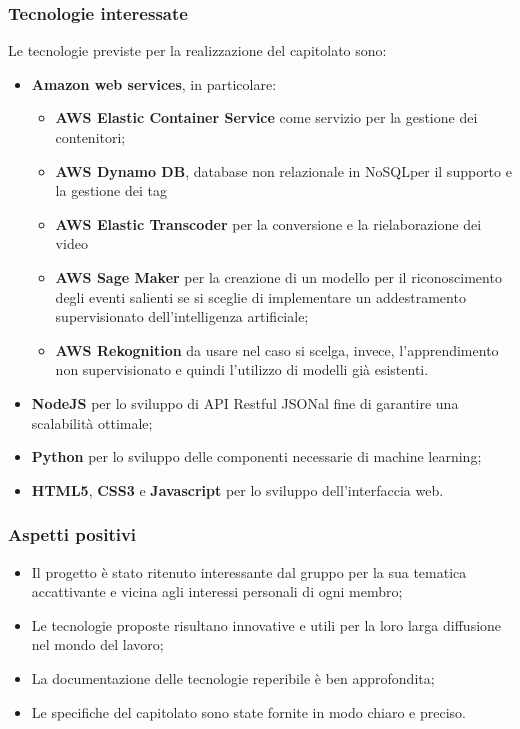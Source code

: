 \subsubsection{Tecnologie interessate}
Le tecnologie previste per la realizzazione del capitolato sono:
\begin{itemize}
	\item \textbf{Amazon web services\glo}, in particolare:
	\begin{itemize}
		\item \textbf{AWS Elastic Container Service\glo} come servizio per la gestione dei contenitori;
		\item \textbf{AWS Dynamo DB\glo}, database non relazionale in NoSQL\glo per il supporto e la gestione dei tag
		\item \textbf{AWS Elastic Transcoder\glo} per la conversione e la rielaborazione dei video
		\item \textbf{AWS Sage Maker\glo} per la creazione di un modello per il riconoscimento degli eventi salienti se si sceglie di implementare un addestramento supervisionato dell'intelligenza artificiale;
		\item \textbf{AWS Rekognition\glo} da usare nel caso si scelga, invece, l'apprendimento non supervisionato e quindi l'utilizzo di modelli già esistenti.
	\end{itemize}
	\item \textbf{NodeJS\glo} per lo sviluppo di API Restful JSON\glo al fine di garantire una scalabilità ottimale;
	\item \textbf{Python\glo} per lo sviluppo delle componenti necessarie di machine learning;
	\item \textbf{HTML5\glo}, \textbf{CSS3\glo} e \textbf{Javascript\glo} per lo sviluppo dell'interfaccia web. 
\end{itemize}
\subsubsection{Aspetti positivi}
\begin{itemize}
	\item Il progetto è stato ritenuto interessante dal gruppo per la sua tematica accattivante e vicina agli interessi personali di ogni membro;
	\item Le tecnologie proposte risultano innovative e utili per la loro larga diffusione nel mondo del lavoro;
	\item La documentazione delle tecnologie reperibile è ben approfondita;
	\item Le specifiche del capitolato sono state fornite in modo chiaro e preciso. 
\end{itemize}
